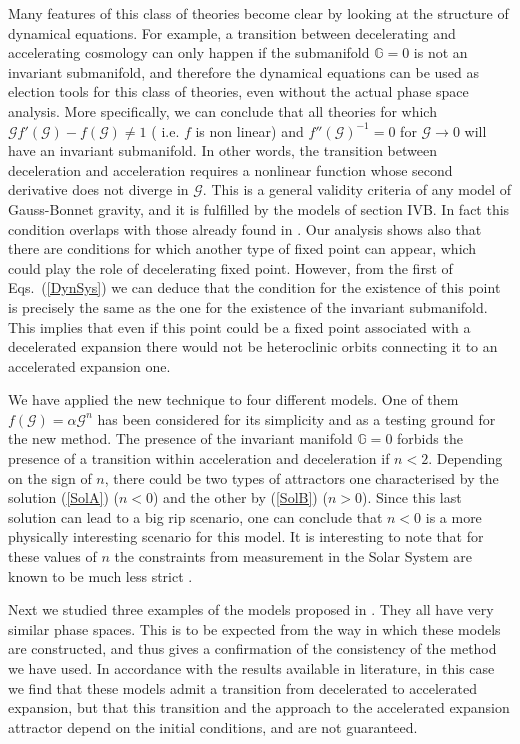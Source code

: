 \documentclass[a4paper,aps,onecolumn,nofootinbib]{revtex4}
\def\rf#1{(\ref{#1})}
\begin{document}
Many features of this class of theories become clear  by looking at the structure of dynamical equations. For example, a transition between decelerating and  accelerating cosmology can only happen if the submanifold $\mathbb{G}=0$ is not an invariant submanifold, and therefore the dynamical equations can be used as election tools for this class of theories, even without the actual phase space analysis. More specifically,  we can conclude that all theories for which   $\mathcal{G}f'(\mathcal{G})-f(\mathcal{G})\neq1$ ( i.e. $f$ is non linear) and $f''(\mathcal{G})^{-1}=0$ for $\mathcal{G}\rightarrow0$ will have  an invariant submanifold. In other words, the transition between deceleration and acceleration requires a nonlinear function whose second derivative does not diverge in $\mathcal{G}$. This is a general validity criteria of any model of Gauss-Bonnet  gravity, and it is fulfilled by the models of section IVB. In fact this condition overlaps with those already found in \cite{DeFelice:2008wz}. Our analysis shows also that there are conditions for which another type of fixed point can appear, which could play the role of %
decelerating fixed point. However, from the first of  Eqs.~(\ref{DynSys}) we can deduce that the condition for the existence of this point is precisely the same as the one  
 for the existence of the invariant submanifold. This implies that even if this point could be a  fixed point  associated with a decelerated expansion there would not be heteroclinic orbits
connecting it to an accelerated expansion one. 

We have applied the new technique to four different models. One of them $f(\mathcal{G})=\alpha \mathcal{G}^n$ has been considered for its simplicity and as a testing ground for the new method.  The presence of the invariant manifold $\mathbb{G}=0$ forbids the presence of a transition within acceleration and deceleration if $n<2$.  Depending on the sign of $n$, there could be two types of attractors one characterised by the solution \rf{SolA} ($n<0$) and the other by \rf{SolB} ($n>0$). Since this last solution can lead to a big rip scenario, one can conclude that $n<0$ is a more physically interesting scenario for this model. It is interesting to note that for these values of $n$ the constraints from measurement in the Solar System are known to be much less strict \cite{Davis:2007id}.

Next we studied three examples of the models proposed in \cite{DeFelice:2008wz}. They all have very similar phase spaces. This is to be expected from the way in which these models are constructed, and thus gives a confirmation of the consistency of the method we have used. In accordance with the results available in literature, in this case we find that these models admit a transition
from decelerated to accelerated expansion, but that this transition and the approach to the accelerated expansion attractor depend on the initial conditions, and are  
not guaranteed.
\end{document}
